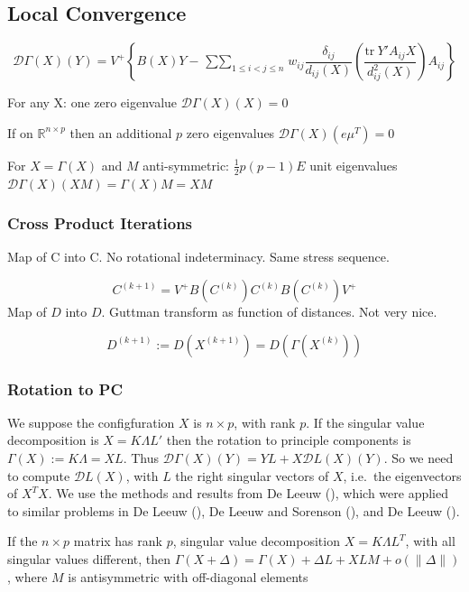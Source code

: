 \documentclass[
  12pt,
  letterpaper,
  DIV=11,
  numbers=noendperiod]{scrreprt}
\theoremstyle{remark}
\begin{document}
\subsection{Local Convergence}\label{minlocconv}

\[
\mathcal{D}\Gamma(X)(Y)=V^+\left\{B(X)Y-\mathop{\sum\sum}_{1\leq i<j\leq n} w_{ij}\frac{\delta_{ij}}{d_{ij}(X)}\left(\frac{\text{tr}\ Y'A_{ij}X}{d_{ij}^2(X)}\right)A_{ij}\right\}
\]

For any X: one zero eigenvalue \(\mathcal{D}\Gamma(X)(X)=0\)

If on \(\mathbb{R}^{n\times p}\) then an additional \(p\) zero
eigenvalues \(\mathcal{D}\Gamma(X)(e\mu^T)=0\)

For \(X=\Gamma(X)\) and \(M\) anti-symmetric: \(\frac12 p(p-1)E\) unit
eigenvalues \(\mathcal{D}\Gamma(X)(XM)=\Gamma(X)M=XM\)

\subsubsection{Cross Product Iterations}\label{cross-product-iterations}

Map of C into C. No rotational indeterminacy. Same stress sequence.

\[
C^{(k+1)}=V^+B(C^{(k)})C^{(k)}B(C^{(k)})V^+
\] Map of \(D\) into \(D\). Guttman transform as function of distances.
Not very nice.

\[
D^{(k+1)}:=D(X^{(k+1)})=D(\Gamma(X^{(k)}))
\]

\subsubsection{Rotation to PC}\label{rotation-to-pc}

We suppose the configfuration \(X\) is \(n\times p\), with rank \(p\).
If the singular value decomposition is \(X=K\Lambda L'\) then the
rotation to principle components is \(\Gamma(X):=K\Lambda=XL\). Thus
\(\mathcal{D}\Gamma(X)(Y)=YL+X\mathcal{D}L(X)(Y)\). So we need to
compute \(\mathcal{D}L(X)\), with \(L\) the right singular vectors of
\(X\), i.e.~the eigenvectors of \(X^TX\). We use the methods and results
from De Leeuw (), which were applied
to similar problems in De Leeuw (),
De Leeuw and Sorenson (), and
De Leeuw ().

\label{minrotpc}
If the \(n\times p\) matrix has rank \(p\), singular value decomposition
\(X=K\Lambda L^T\), with all singular values different, then
\(\Gamma(X+\Delta)=\Gamma(X)+\Delta L+XLM+o(\|\Delta\|)\), where \(M\)
is antisymmetric with off-diagonal elements
\end{document}
